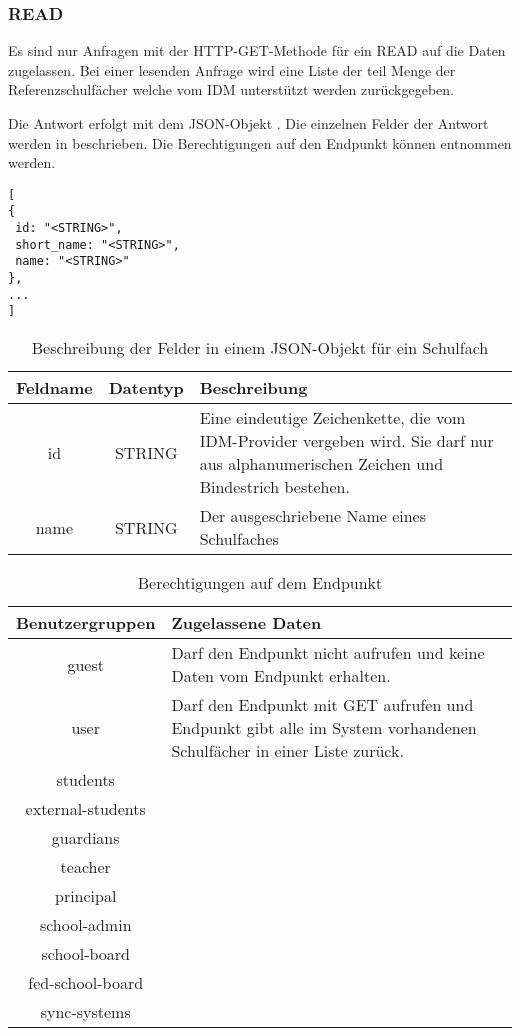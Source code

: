 \subsubsection{READ}
\label{sec:rest:api:school-subjects:read}
Es sind nur Anfragen mit der HTTP-GET-Methode für ein READ auf die Daten zugelassen.
Bei einer lesenden Anfrage wird eine Liste der teil Menge der Referenzschulfächer welche vom IDM unterstützt werden zurückgegeben.

Die Antwort erfolgt mit dem JSON-Objekt . Die einzelnen Felder der Antwort werden in  beschrieben.
Die Berechtigungen auf den Endpunkt können  entnommen werden.

\begin{lstlisting}[caption={JSON-Antwort für einen GET-Aufruf der Route /api/school-subjects},label={lst:code:rest:api:school-subjects:read:ret},frame=tlrb]
[
{
 id: "<STRING>",
 short_name: "<STRING>",
 name: "<STRING>"
},
...
]
\end{lstlisting}
\begin{table}[!htb]
	\begin{tabularx}{\textwidth}{|c|c|X|}
		\hline
			\textbf{Feldname} & \textbf{Datentyp} & \textbf{Beschreibung} \\ \hline
			id & STRING & Eine eindeutige Zeichenkette, die vom IDM-Provider vergeben wird. Sie darf nur aus alphanumerischen Zeichen und Bindestrich bestehen.\\ \hline
			name & STRING & Der ausgeschriebene Name eines Schulfaches \\ \hline
	\end{tabularx}

		\caption{Beschreibung der Felder in einem JSON-Objekt für ein Schulfach}
		\label{tab:rest:api:school-subjects:read:ret:json}
\end{table}
\begin{longtable}{|c|p{}|}
\caption{Berechtigungen auf dem Endpunkt}
\endfoot
		\caption{Berechtigungen auf dem Endpunkt}
		\label{tab:rest:api:school-subjects:read:right}
\endlastfoot 
\hline
\textbf{Benutzergruppen} & \textbf{Zugelassene Daten} \\ \hline
\endhead
guest & Darf den Endpunkt nicht aufrufen und keine Daten vom Endpunkt erhalten. \\ \hline
user & Darf den Endpunkt mit GET aufrufen und Endpunkt gibt alle im System vorhandenen Schulfächer in einer Liste zurück. \\ \hline
students &  \\ \hline
external-students &  \\ \hline
guardians &  \\ \hline
teacher &  \\ \hline
principal &  \\ \hline
school-admin &  \\ \hline
school-board &  \\ \hline
fed-school-board &  \\ \hline
sync-systems &  \\ \hline
	\end{longtable}
